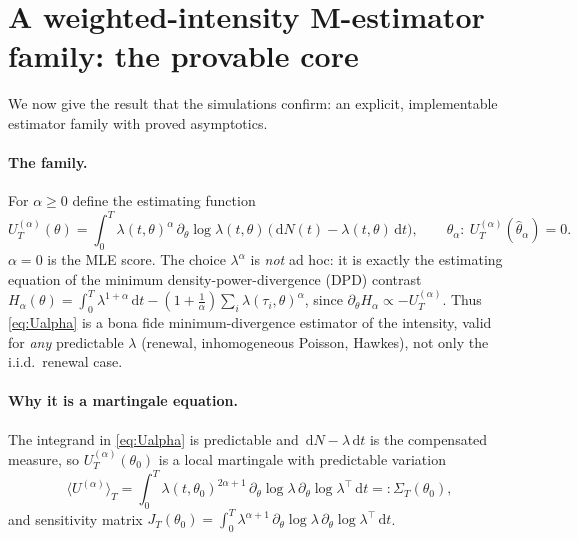 \documentclass[11pt]{article}
\newcommand{\dd}{\,\mathrm{d}}
\begin{document}
\section{A weighted-intensity M-estimator family: the provable core}
\label{sec:mest}
We now give the result that the simulations confirm: an explicit, implementable
estimator family with proved asymptotics.

\paragraph{The family.} For $\alpha\ge0$ define the estimating function
\begin{equation}\label{eq:Ualpha}
U_T^{(\alpha)}(\theta)=\int_0^T \lambda(t,\theta)^{\alpha}\,
\partial_\theta\log\lambda(t,\theta)\,\big(\dd N(t)-\lambda(t,\theta)\dd t\big),
\qquad \hat\theta_\alpha:\ U_T^{(\alpha)}(\hat\theta_\alpha)=0 .
\end{equation}
$\alpha=0$ is the MLE score. The choice $\lambda^{\alpha}$ is \emph{not} ad hoc:
it is exactly the estimating equation of the minimum density-power-divergence
(DPD) contrast \citep{basu1998}
$H_\alpha(\theta)=\int_0^T\!\lambda^{1+\alpha}\dd t-(1+\tfrac1\alpha)\sum_{i}\lambda(\tau_i,\theta)^{\alpha}$,
since $\partial_\theta H_\alpha\propto -U_T^{(\alpha)}$. Thus
\eqref{eq:Ualpha} is a bona fide minimum-divergence estimator of the intensity,
valid for \emph{any} predictable $\lambda$ (renewal, inhomogeneous Poisson,
Hawkes), not only the i.i.d.\ renewal case.

\paragraph{Why it is a martingale equation.} The integrand in \eqref{eq:Ualpha}
is predictable and $\dd N-\lambda\dd t$ is the compensated measure, so
$U_T^{(\alpha)}(\theta_0)$ is a local martingale with predictable variation
\begin{equation}\label{eq:Sigma}
\langle U^{(\alpha)}\rangle_T=\int_0^T \lambda(t,\theta_0)^{2\alpha+1}\,
\partial_\theta\log\lambda\,\partial_\theta\log\lambda^{\!\top}\dd t=:\Sigma_T(\theta_0),
\end{equation}
and sensitivity matrix
$J_T(\theta_0)=\int_0^T \lambda^{\alpha+1}\,\partial_\theta\log\lambda\,
\partial_\theta\log\lambda^{\!\top}\dd t$.
\end{document}
